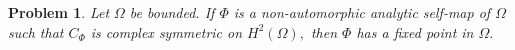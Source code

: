\documentclass[11pt]{amsart}%
\newtheorem{conj}[thm]{Problem}
\theoremstyle{definition}
\theoremstyle{remark}
\numberwithin{equation}{section}
\begin{document}
\begin{conj}
Let $\Omega$ be bounded. If $\Phi$ is a non-automorphic analytic self-map of
$\Omega$ such that $C_{\Phi}$ is complex symmetric on $H^2(\Omega),$ then $\Phi$ has a fixed
point in $\Omega.$
\end{conj}


\end{document}
